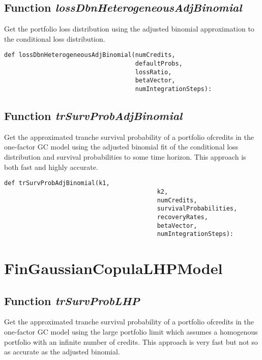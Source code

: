 \documentclass[twoside,11pt]{book}
\begin{document}
\subsection{Function {\it lossDbnHeterogeneousAdjBinomial}}
Get the portfolio loss distribution using the adjusted binomial approximation to the conditional loss distribution. 

\begin{lstlisting}
def lossDbnHeterogeneousAdjBinomial(numCredits, 
                                    defaultProbs, 
                                    lossRatio,
                                    betaVector,
                                    numIntegrationSteps):
\end{lstlisting}

\subsection{Function {\it trSurvProbAdjBinomial}}
Get the approximated tranche survival probability of a portfolio ofcredits in the one-factor GC model using the adjusted binomial fit of the conditional loss distribution and survival probabilities to some time horizon. This approach is both fast and highly accurate. 

\begin{lstlisting}
def trSurvProbAdjBinomial(k1, 
                                          k2, 
                                          numCredits,
                                          survivalProbabilities, 
                                          recoveryRates, 
                                          betaVector,
                                          numIntegrationSteps):
\end{lstlisting}

\newpage
\section{FinGaussianCopulaLHPModel}

\subsection{Function {\it trSurvProbLHP}}
Get the approximated tranche survival probability of a portfolio ofcredits in the one-factor GC model using the large portfolio limit which assumes a homogenous portfolio with an infinite number of credits. This approach is very fast but not so as accurate as the adjusted binomial. 
\end{document}
